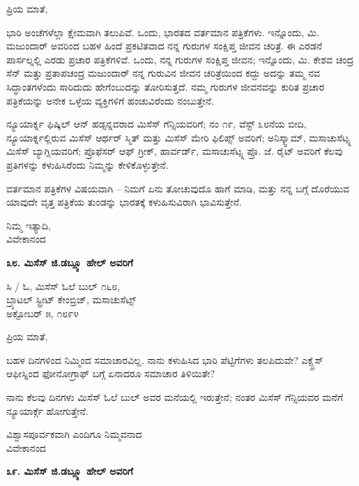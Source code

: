 ಪ್ರಿಯ ಮಾತೆ,

ಭಾರಿ ಅಂಚೆಗಳೆಲ್ಲಾ ಕ್ಷೇಮವಾಗಿ ತಲುಪಿವೆ. ಒಂದು, ಭಾರತದ ವರ್ತಮಾನ ಪತ್ರಿಕೆಗಳು. ಇನ್ನೊಂದು, ಮಿ. ಮಜುಂದಾರ್ ಅವರಿಂದ ಬಹಳ ಹಿಂದೆ ಪ್ರಕಟಿತವಾದ ನನ್ನ ಗುರುಗಳ ಸಂಕ್ಷಿಪ್ತ ಜೀವನ ಚರಿತ್ರೆ. ಈ ಎರಡನೆ ಪಾರ್ಸಲ್ನಲ್ಲಿ ಎರಡು ಪ್ರಚಾರ ಪತ್ರಿಕೆಗಳಿವೆ. ಒಂದು, ನನ್ನ ಗುರುಗಳ ಸಂಕ್ಷಿಪ್ತ ಜೀವನ; ಇನ್ನೊಂದು, ಮಿ. ಕೇಶವ ಚಂದ್ರ ಸೆನ್ ಮತ್ತು ಪ್ರತಾಪಚಂದ್ರ ಮಜುಂದಾರ್ ನನ್ನ ಗುರುವಿನ ಜೀವನ ಚರಿತ್ರೆಯಿಂದ ಕದ್ದು ಅದನ್ನು ತಮ್ಮ ನವ ಸಿದ್ಧಾಂತಗಳೆಂದು ಸಾರಿದುದು ಹೇಗೆಂಬುದನ್ನು ತೋರಿಸುತ್ತದೆ. ನಮ್ಮ ಗುರುಗಳ ಜೀವನವನ್ನು ಕುರಿತ ಪ್ರಚಾರ ಪತ್ರಿಕೆಯನ್ನು ಅನೇಕ ಒಳ್ಳೆಯ ವ್ಯಕ್ತಿಗಳಿಗೆ ಹಂಚುವಿರೆಂದು ನಂಬುತ್ತೇನೆ.

ನ್ಯೂಯಾರ್ಕ್ನ ಫಿಷ್ಕಿಲ್ ಆನ್ ಹಡ್ಸನ್ನವರಾದ ಮಿಸೆಸ್ ಗೆನ್ಸಿಯವರಿಗೆ; ನಂ ೧೯, ವೆಸ್ಟ್ ೩೮ನೆಯ ಬೀದಿ, ನ್ಯೂಯಾರ್ಕ್ನಲ್ಲಿರುವ ಮಿಸೆಸ್ ಆರ್ಥರ್ ಸ್ಮಿತ್ ಮತ್ತು ಮಿಸೆಸ್ ಮೇರಿ ಫಿಲಿಪ್ಸ್ ಅವರಿಗೆ; ಅನಿಸ್ಕ್ವಾಮ್​, ಮಸಾಚುಸೆಟ್ಸ್ನ ಮಿಸೆಸ್ ಬ್ಯಾಗ್ಲಿಯವರಿಗೆ; ಪ್ರೊಫೆಸರ್ ಆಫ್ ಗ್ರೀಕ್, ಹಾರ್ವರ್ಡ್, ಮಸಾಚುಸೆಟ್ಸ್ನ ಪ್ರೊ. ಜೆ. ರೈಟ್ ಅವರಿಗೆ ಕೆಲವು ಪ್ರತಿಗಳನ್ನು ಕಳುಹಿಸಿರೆಂದು ನಿಮ್ಮನ್ನು ಕೇಳಿಕೊಳ್ಳುತ್ತೇನೆ.

ವರ್ತಮಾನ ಪತ್ರಿಕೆಗಳ ವಿಷಯವಾಗಿ – ನಿಮಗೆ ಏನು ತೋಚುವುದೊ ಹಾಗೆ ಮಾಡಿ, ಮತ್ತು ನನ್ನ ಬಗ್ಗೆ ದೊರೆಯುವ ಯಾವುದೇ ವೃತ್ತ ಪತ್ರಿಕೆಯ ತುಂಡನ್ನು ಭಾರತಕ್ಕೆ ಕಳುಹಿಸುವಿರಾಗಿ ಭಾವಿಸುತ್ತೇನೆ.

\begin{flushright}
ನಿಮ್ಮ ಇತ್ಯಾದಿ,\\ವಿವೇಕಾನಂದ
\end{flushright}

\begin{center}
\textbf{೩೮. ಮಿಸೆಸ್ ಜಿ.ಡಬ್ಲ್ಯೂ ಹೇಲ್ ಅವರಿಗೆ}
\end{center}

\begin{flushright}
ಸಿ / ಓ, ಮಿಸೆಸ್ ಓಲೆ ಬುಲ್ ೧೬೮,\\ಬ್ರ್ಯಾಟಲ್ ಸ್ಟ್ರೀಟ್ ಕೇಂಬ್ರಿಜ್, ಮಸಾಚುಸೆಟ್ಸ್\\ಅಕ್ಟೋಬರ್ ೫, ೧೮೯೪
\end{flushright}

ಪ್ರಿಯ ಮಾತೆ,

ಬಹಳ ದಿನಗಳಿಂದ ನಿಮ್ಮಿಂದ ಸಮಾಚಾರವಿಲ್ಲ. ನಾನು ಕಳುಹಿಸಿದ ಭಾರಿ ಪೆಟ್ಟಿಗೆಗಳು ತಲಪಿದುವೇ? ಎಕ್ಸ್ಪ್ರೆಸ್ ಆಫೀಸ್ನಿಂದ ಫೋನೋಗ್ರಾಫ್ ಬಗ್ಗೆ ಏನಾದರೂ ಸಮಾಚಾರ ತಿಳಿಯಿತೇ?

ನಾನು ಕೆಲವು ದಿನಗಳು ಮಿಸೆಸ್ ಓಲೆ ಬುಲ್ ಅವರ ಮನೆಯಲ್ಲಿ ಇರುತ್ತೇನೆ; ನಂತರ ಮಿಸೆಸ್ ಗೆನ್ಸಿಯವರ ಮನೆಗೆ ನ್ಯೂಯಾರ್ಕ್ಗೆ ಹೋಗುತ್ತೇನೆ.

\begin{flushright}
ವಿಶ್ವಾಸಪೂರ್ವಕವಾಗಿ ಎಂದಿಗೂ ನಿಮ್ಮವನಾದ\\ವಿವೇಕಾನಂದ
\end{flushright}

\begin{center}
\textbf{೩೯. ಮಿಸೆಸ್ ಜಿ.ಡಬ್ಲ್ಯೂ ಹೇಲ್ ಅವರಿಗೆ}
\end{center}

